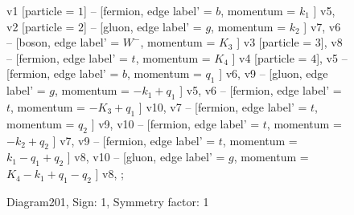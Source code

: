 \documentclass{revtex4}
\begin{document}
\begin{figure}[!htb]
\begin{center}
{    %
v1 [particle = \(1\)] -- [fermion, edge label' = \(b\), momentum = \(k_{1}\) ] v5, 
v2 [particle = \(2\)] -- [gluon, edge label' = \(g\), momentum = \(k_{2}\) ] v7, 
v6 -- [boson, edge label' = \(W^{-}\), momentum = \(K_{3}\) ] v3 [particle = \(3\)], 
v8 -- [fermion, edge label' = \(t\), momentum = \(K_{4}\) ] v4 [particle = \(4\)], 
v5 -- [fermion, edge label' = \(b\), momentum = \(q_{1}\) ] v6, 
v9 -- [gluon, edge label' = \(g\), momentum = \(-k_{1} + q_{1}\) ] v5, 
v6 -- [fermion, edge label' = \(t\), momentum = \(-K_{3} + q_{1}\) ] v10, 
v7 -- [fermion, edge label' = \(t\), momentum = \(q_{2}\) ] v9, 
v10 -- [fermion, edge label' = \(t\), momentum = \(-k_{2} + q_{2}\) ] v7, 
v9 -- [fermion, edge label' = \(t\), momentum = \(k_{1} - q_{1} + q_{2}\) ] v8, 
v10 -- [gluon, edge label' = \(g\), momentum = \(K_{4} - k_{1} + q_{1} - q_{2}\) ] v8, 
};
\end{center}
\caption{Diagram201, Sign: 1, Symmetry factor: 1}
\end{figure}
\newpage
\end{document}
